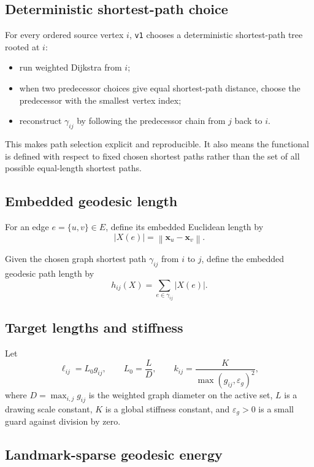 \documentclass[11pt]{article}
\newcommand{\norm}[1]{\left\lVert #1 \right\rVert}
\newcommand{\code}[1]{\begingroup\urlstyle{tt}\nolinkurl{#1}\endgroup}
\newcommand{\vect}[1]{\mathbf{#1}}
\begin{document}
\subsection{Deterministic shortest-path choice}

For every ordered source vertex $i$, \code{v1} chooses a deterministic
shortest-path tree rooted at $i$:
\begin{itemize}[leftmargin=1.4em]
  \item run weighted Dijkstra from $i$;
  \item when two predecessor choices give equal shortest-path distance, choose
    the predecessor with the smallest vertex index;
  \item reconstruct $\gamma_{ij}$ by following the predecessor chain from $j$
    back to $i$.
\end{itemize}

This makes path selection explicit and reproducible. It also means the
functional is defined with respect to fixed chosen shortest paths rather than
the set of all possible equal-length shortest paths.

\subsection{Embedded geodesic length}

For an edge $e=\{u,v\}\in E$, define its embedded Euclidean length by
\[
|X(e)| = \norm{\vect{x}_u - \vect{x}_v}.
\]

Given the chosen graph shortest path $\gamma_{ij}$ from $i$ to $j$, define the
embedded geodesic path length by
\[
h_{ij}(X) = \sum_{e \in \gamma_{ij}} |X(e)|.
\]

\subsection{Target lengths and stiffness}

Let
\[
\ell_{ij} = L_0 g_{ij},
\qquad
L_0 = \frac{L}{D},
\qquad
k_{ij} = \frac{K}{\max(g_{ij}, \varepsilon_g)^2},
\]
where $D=\max_{i,j} g_{ij}$ is the weighted graph diameter on the active set,
$L$ is a drawing scale constant, $K$ is a global stiffness constant, and
$\varepsilon_g > 0$ is a small guard against division by zero.

\subsection{Landmark-sparse geodesic energy}
\end{document}
